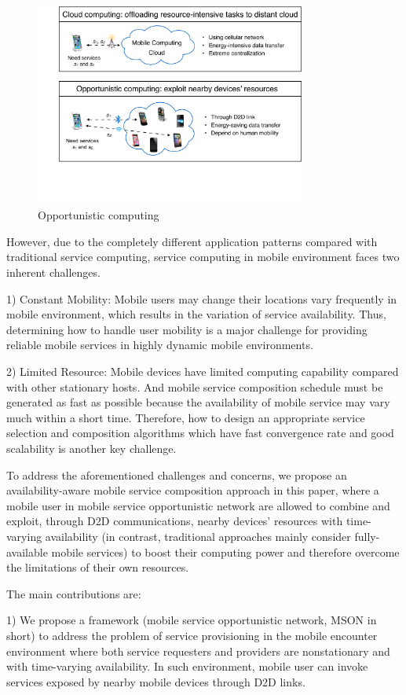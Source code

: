 \documentclass[journal]{IEEEtran}
\begin{document}
\begin{figure}[!t]
\centering
\includegraphics[width=3.5in]{./img/pic1.pdf}
\caption{Opportunistic computing}
\label{Opportunistic computing}
\end{figure}

However, due to the completely different application patterns compared with traditional service computing, service computing in mobile environment faces two inherent challenges.

1) Constant Mobility: Mobile users may change their locations vary frequently in mobile environment, which results in the variation of service availability. Thus, determining how to handle user mobility is a major challenge for providing reliable mobile services in highly dynamic mobile environments.

2) Limited Resource: Mobile devices have limited computing capability compared with other stationary hosts. And mobile service composition schedule must be generated as fast as possible because the availability of mobile service may vary much within a short time. Therefore, how to design an appropriate service selection and composition algorithms which have fast convergence rate and good scalability is another key challenge.

To address the aforementioned challenges and concerns, we propose an availability-aware mobile service composition approach in this paper, where a mobile user in mobile service opportunistic network are allowed to combine and exploit, through D2D communications, nearby devices' resources with time-varying availability (in contrast, traditional approaches mainly consider fully-available mobile services) to boost their computing power and therefore overcome the limitations of their own resources. 

The main contributions are:

1) We propose a framework (mobile service opportunistic network, MSON in short) to address the problem of service provisioning in the mobile encounter environment where both service requesters and providers are nonstationary and with time-varying availability. In such environment, mobile user can invoke services exposed by nearby mobile devices through D2D links.
\end{document}
